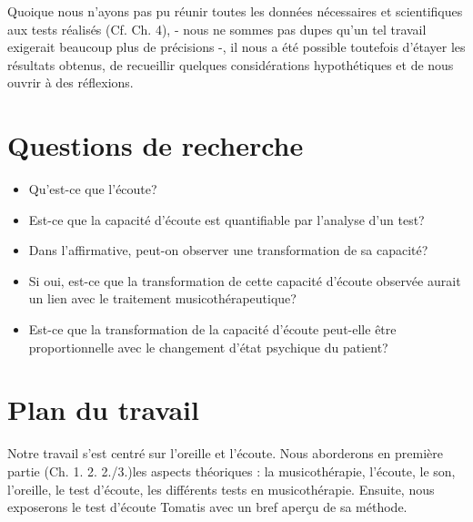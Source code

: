Quoique nous n'ayons pas pu réunir toutes les données nécessaires et scientifiques
aux tests réalisés (Cf. Ch. 4), - nous ne sommes pas dupes qu'un tel travail
exigerait beaucoup plus de précisions -, il nous a été possible toutefois d'étayer
les résultats obtenus, de recueillir quelques considérations hypothétiques et de nous ouvrir à des réflexions.







\section {Questions de recherche}




\begin{itemize}
 \item Qu'est-ce que l'écoute?
 \item Est-ce que la capacité d'écoute est quantifiable par
          l'analyse d'un test?
        \item Dans l'affirmative,
          peut-on observer une transformation de sa capacité?
        \item Si oui, est-ce que la transformation de cette capacité d'écoute observée aurait un lien
          avec le traitement musicothérapeutique?
  \item Est-ce que la transformation de la capacité d'écoute peut-elle être proportionnelle avec le changement d'état psychique du patient?
   \end{itemize}




\section*{Plan du travail}

Notre travail s'est centré sur l'oreille et l'écoute.
Nous aborderons en première partie (Ch. 1. 2. 2./3.)les aspects théoriques : la musicothérapie, l'écoute, le son, l'oreille, le
test d'écoute, les différents tests en musicothérapie. Ensuite, nous
exposerons le test d'écoute Tomatis avec un bref aperçu de sa méthode.

